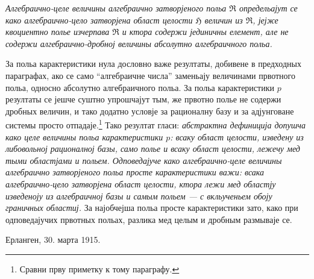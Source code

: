 ﻿\documentclass[11pt]{article}
\begin{document}
{\itshape Алгебраично-целе величины алгебраично затворјеного польа
$\mathfrak R$ определьајут се како алгебраично-цело затворјена област целости
$\mathfrak H$ величин из $\mathfrak R$, јејже квоциентно полье изчерпава
$\mathfrak R$ и ктора содержи јединичны елемент, але не содержи
алгебраично-дробној величины абсолутно алгебраичного польа.}

За польа карактеристики нула дословно важе резултаты, добивене в предходных
параграфах, ако се само ``алгебраичне числа'' заменьају величинами првотного
польа, односно абсолутно алгебраичного польа. За польа карактеристики $p$
резултаты се јешче суштно упрошчајут тым, же првотно полье не содержи дробных
величин, и тако додатно условје за рационалну базу и за адјунговане системы
просто отпадаје.\footnote{Сравни прву приметку к тому параграфу.} Тако резултат
гласи: {\itshape абстрактна дефиниција допушча како целе величины польа
карактеристики $p$: всаку област целости, изведену из либовольној рационалној
базы, само полье и всаку област целости, лежечу мед тыми областјами и польем.
Одповедајуче како алгебраично-целе величины алгебраично затворјеного польа просте
карактеристики важи: всака алгебраично-цело затворјена област целости, ктора
лежи мед областју изведеноју из алгебраичној базы и самым польем --- с
вкльученьем обоју граничных областиј.} За најобчејша польа просте
карактеристики зато, како при одповедајучих првотных польах, разлика мед целым и
дробным размываје се.

\medskip
\noindent Ерланген, 30. марта 1915.

\clearpage
\end{document}
